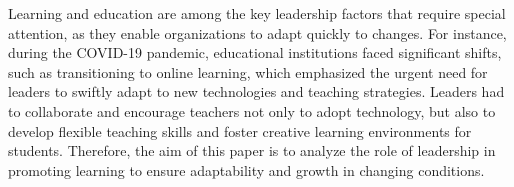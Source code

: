 Learning and education are among the key leadership factors that require special attention, as they
enable organizations to adapt quickly to changes. For instance, during the COVID-19 pandemic,
educational institutions faced significant shifts, such as transitioning to online learning, which
emphasized the urgent need for leaders to swiftly adapt to new technologies and teaching strategies.
Leaders had to collaborate and encourage teachers not only to adopt technology, but also to develop
flexible teaching skills and foster creative learning environments for students. Therefore, the aim
of this paper is to analyze the role of leadership in promoting learning to ensure adaptability and
growth in changing conditions.
